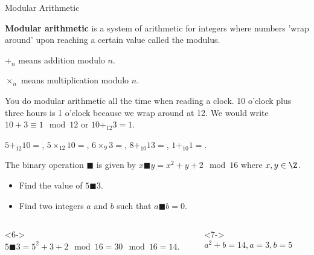 \documentclass[8pt]{beamer}
\begin{document}
\begin{frame}[shrink=5]{Modular Arithmetic}
	\begin{definition}
		\textbf{Modular arithmetic} is a system of arithmetic for integers where numbers 'wrap around' upon reaching a certain value called the modulus.
	\end{definition}
	\begin{definition}
		$+_n$ means addition modulo  $n$.

		 $\times_n$ means multiplication modulo $n$.
	\end{definition}

	You do modular arithmetic all the time when reading a clock.
   10 o'clock plus three hours is 1 o'clock because we wrap around at 12.
	We would write $10+3\equiv 1 \mod 12$ or  $10 +_{12} 3 =1$.

	$5 +_{12} 10 = $,  $5\times_{12} 10=$, $6\times_9 3=$, $8+_{10} 13=$,  $1+_{10}1=$.

	 \begin{problem}
		 The binary operation $\blacksquare$ is given by  $x\blacksquare y=x^2+y+2 \mod 16$ where $x,y \in \Z$.
		 \begin{itemize}
		 	\item Find the value of $5\blacksquare 3$.
			\item Find two integers  $a$ and $b$ such that $a\blacksquare b=0$.
		 \end{itemize}

	\end{problem}
\begin{columns}[T]
	\begin{column}{.5\linewidth}
	\begin{solution}<6->
		$5\blacksquare 3=5^2+3+2 \mod 16 = 30 \mod 16=14$.
	\end{solution}
\end{column}
\begin{column}{.5\linewidth}
	\begin{solution}<7->
		$a^2+b=14, a=3, b=5$
	\end{solution}
\end{column}
\end{columns}
\end{frame}
\end{document}
